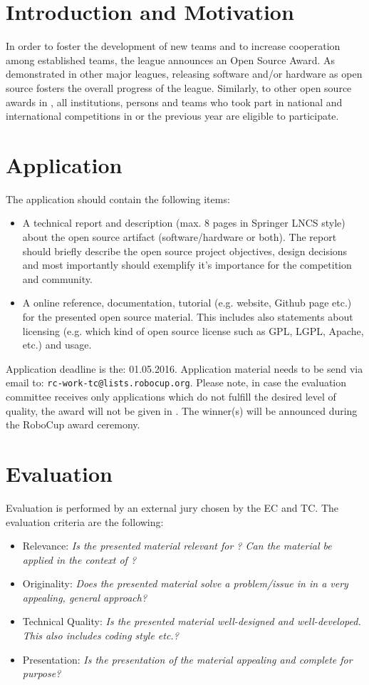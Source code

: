 \section{Introduction and Motivation}

In order to foster the development of new teams and to increase cooperation among established teams, the league announces an Open Source Award. As demonstrated
in other \RC major leagues, releasing software and/or hardware as open source fosters the overall progress of the league. Similarly, to other open source awards in \RC, all institutions, persons and teams who took part in national and international \RCAW competitions in \YEAR or the previous year are eligible to participate.

\section{Application}
The application should contain the following items:

\begin{itemize}
	\item A technical report and description (max. 8 pages in Springer LNCS style) about the open source artifact (software/hardware or both). The report should briefly describe the open source project objectives, design decisions and most importantly should exemplify it's importance for the \RCAW competition and community.
	\item A online reference, documentation, tutorial (e.g. website, Github page etc.) for the presented open source material. This includes also statements about licensing (e.g. which kind of open source license such as GPL, LGPL, Apache, etc.) and usage.
\end{itemize}

Application deadline is the: 01.05.2016. Application material needs to be send via email to: \texttt{rc-work-tc@lists.robocup.org}. Please note, in case the evaluation committee receives  only applications which do not fulfill the desired level of quality, the award will not be given in \YEAR. The winner(s) will be announced during the RoboCup \YEAR award ceremony.


\section{Evaluation}
Evaluation is performed by an external jury chosen by the EC and TC. The evaluation criteria are the following:

\begin{itemize}
	\item Relevance: \emph{Is the presented material relevant for \RCAW? Can the material be applied in the context of \RCAW?}
	\item Originality: \emph{Does the presented material solve a problem/issue in \RCAW in a very appealing, general approach?}
	\item Technical Quality: \emph{Is the presented material well-designed and well-developed. This also includes coding style etc.? }
	\item Presentation: \emph{Is the presentation of the material appealing and complete for \RCAW purpose?}
\end{itemize}
